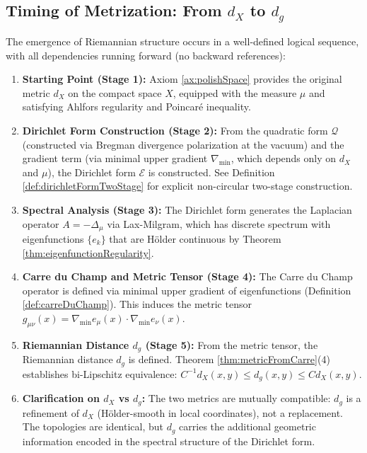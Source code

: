 \subsection{Timing of Metrization: From $d_X$ to $d_g$}
\label{subsec:timingOfMetrizationFromDXToDG}

\begin{remark}
\label{rem:metrizationTiming}
The emergence of Riemannian structure occurs in a well-defined logical sequence, with all dependencies running forward (no backward references):

\begin{enumerate}
\item \textbf{Starting Point (Stage 1):} Axiom \ref{ax:polishSpace} provides the original metric $d_X$ on the compact space $X$, equipped with the measure $\mu$ and satisfying Ahlfors regularity and Poincaré inequality.

\item \textbf{Dirichlet Form Construction (Stage 2):} From the quadratic form $\mathcal{Q}$ (constructed via Bregman divergence polarization at the vacuum) and the gradient term (via minimal upper gradient $\nabla_{\min}$, which depends only on $d_X$ and $\mu$), the Dirichlet form $\mathcal{E}$ is constructed. See Definition \ref{def:dirichletFormTwoStage} for explicit non-circular two-stage construction.

\item \textbf{Spectral Analysis (Stage 3):} The Dirichlet form generates the Laplacian operator $A = -\Delta_\mu$ via Lax-Milgram, which has discrete spectrum with eigenfunctions $\{e_k\}$ that are Hölder continuous by Theorem \ref{thm:eigenfunctionRegularity}.

\item \textbf{Carre du Champ and Metric Tensor (Stage 4):} The Carre du Champ operator is defined via minimal upper gradient of eigenfunctions (Definition \ref{def:carreDuChamp}). This induces the metric tensor $g_{\mu\nu}(x) = \nabla_{\min} e_\mu(x) \cdot \nabla_{\min} e_\nu(x)$.

\item \textbf{Riemannian Distance $d_g$ (Stage 5):} From the metric tensor, the Riemannian distance $d_g$ is defined. Theorem \ref{thm:metricFromCarre}(4) establishes bi-Lipschitz equivalence: $C^{-1} d_X(x, y) \leq d_g(x, y) \leq C d_X(x, y)$.

\item \textbf{Clarification on $d_X$ vs $d_g$:} The two metrics are mutually compatible: $d_g$ is a refinement of $d_X$ (H\"older-smooth in local coordinates), not a replacement. The topologies are identical, but $d_g$ carries the additional geometric information encoded in the spectral structure of the Dirichlet form.
\end{enumerate}


\end{remark}
